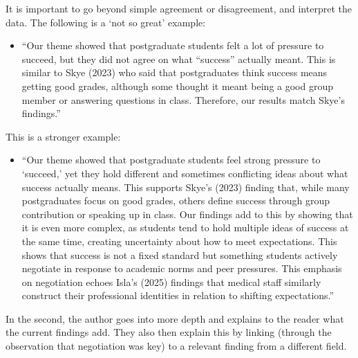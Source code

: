 \documentclass[
  english,
  letterpaper,
  DIV=11,
  numbers=noendperiod]{scrreprt}
\providecommand{\tightlist}{%
  \setlength{\itemsep}{0pt}\setlength{\parskip}{0pt}}
\begin{document}
\begin{tcolorbox}[enhanced jigsaw, breakable, bottomtitle=1mm, leftrule=.75mm, opacityback=0, colbacktitle=quarto-callout-important-color!10!white, opacitybacktitle=0.6, toprule=.15mm, colback=white, left=2mm, coltitle=black, bottomrule=.15mm, titlerule=0mm, title=\textcolor{quarto-callout-important-color}{\faExclamation}\hspace{0.5em}{Going beyond `agreement/disagreement'}, toptitle=1mm, colframe=quarto-callout-important-color-frame, arc=.35mm, rightrule=.15mm]

It is important to go beyond simple agreement or disagreement, and
interpret the data. The following is a `not so great' example:

\begin{itemize}
\tightlist
\item
  ``Our theme showed that postgraduate students felt a lot of pressure
  to succeed, but they did not agree on what ``success'' actually meant.
  This is similar to Skye (2023) who said that postgraduates think
  success means getting good grades, although some thought it meant
  being a good group member or answering questions in class. Therefore,
  our results match Skye's findings.''
\end{itemize}

This is a stronger example:

\begin{itemize}
\tightlist
\item
  ``Our theme showed that postgraduate students feel strong pressure to
  `succeed,' yet they hold different and sometimes conflicting ideas
  about what success actually means. This supports Skye's (2023) finding
  that, while many postgraduates focus on good grades, others define
  success through group contribution or speaking up in class. Our
  findings add to this by showing that it is even more complex, as
  students tend to hold multiple ideas of success at the same time,
  creating uncertainty about how to meet expectations. This shows that
  success is not a fixed standard but something students actively
  negotiate in response to academic norms and peer pressures. This
  emphasis on negotiation echoes Isla's (2025) findings that medical
  staff similarly construct their professional identities in relation to
  shifting expectations.''
\end{itemize}

In the second, the author goes into more depth and explains to the
reader what the current findings add. They also then explain this by
linking (through the observation that negotiation was key) to a relevant
finding from a different field.

\end{tcolorbox}
\end{document}
